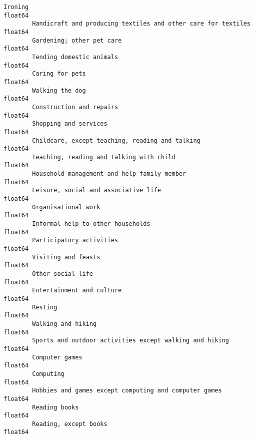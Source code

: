 \documentclass[11pt]{article}
\begin{document}
\begin{Verbatim}[commandchars=\\\{\}]
        Ironing                                                                             float64
        Handicraft and producing textiles and other care for textiles                       float64
        Gardening; other pet care                                                           float64
        Tending domestic animals                                                            float64
        Caring for pets                                                                     float64
        Walking the dog                                                                     float64
        Construction and repairs                                                            float64
        Shopping and services                                                               float64
        Childcare, except teaching, reading and talking                                     float64
        Teaching, reading and talking with child                                            float64
        Household management and help family member                                         float64
        Leisure, social and associative life                                                float64
        Organisational work                                                                 float64
        Informal help to other households                                                   float64
        Participatory activities                                                            float64
        Visiting and feasts                                                                 float64
        Other social life                                                                   float64
        Entertainment and culture                                                           float64
        Resting                                                                             float64
        Walking and hiking                                                                  float64
        Sports and outdoor activities except walking and hiking                             float64
        Computer games                                                                      float64
        Computing                                                                           float64
        Hobbies and games except computing and computer games                               float64
        Reading books                                                                       float64
        Reading, except books                                                               float64

\end{Verbatim}
\end{document}
